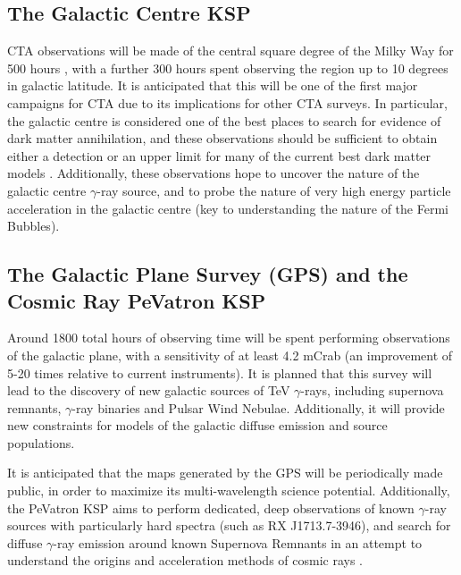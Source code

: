 \subsection{The Galactic Centre KSP}
CTA observations will be made of the central square degree of the Milky Way for 500 hours \cite{scienceCTA}, with a further 300 hours spent observing the region up to 10 degrees in galactic latitude. It is anticipated that this will be one of the first major campaigns for CTA due to its implications for other CTA surveys.
In particular, the galactic centre is considered one of the best places to search for evidence of dark matter annihilation, and these observations should be sufficient to obtain either a detection or an upper limit for many of the current best dark matter models \cite{scienceCTA}. Additionally, these observations hope to uncover the nature of the galactic centre $\gamma$-ray source, and to probe the nature of very high energy particle acceleration in the galactic centre (key to understanding the nature of the Fermi Bubbles). 

\subsection{The Galactic Plane Survey (GPS) and the Cosmic Ray PeVatron KSP}
Around 1800 total hours of observing time will be spent performing observations of the galactic plane, with a sensitivity of at least 4.2 mCrab \cite{scienceCTA} (an improvement of 5-20 times relative to current instruments). It is planned that this survey will lead to the discovery of new galactic sources of TeV $\gamma$-rays, including supernova remnants, $\gamma$-ray binaries and Pulsar Wind Nebulae. Additionally, it will provide new constraints for models of the galactic diffuse emission and source populations. 

It is anticipated that the maps generated by the GPS will be periodically made public, in order to maximize its multi-wavelength science potential.
Additionally, the PeVatron KSP aims to perform dedicated, deep observations of known $\gamma$-ray sources with particularly hard spectra (such as RX J1713.7-3946), and search for diffuse $\gamma$-ray emission around known Supernova Remnants in an attempt to understand the origins and acceleration methods of cosmic rays \cite{scienceCTA}.

